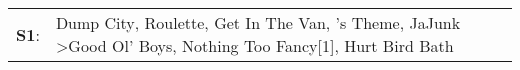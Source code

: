\begin{supertabular}{p{0.03\textwidth}p{0.92\textwidth}}
 \textbf{S1}:  &  Dump City\textsuperscript{}, \enspace Roulette\textsuperscript{}, \enspace Get In The Van\textsuperscript{}, 's Theme\textsuperscript{}, \enspace JaJunk\textsuperscript{} \textgreater \enspace Good Ol' Boys\textsuperscript{}, \enspace Nothing Too Fancy[1]\textsuperscript{}, \enspace Hurt Bird Bath\textsuperscript{}  \enspace  \\
\end{supertabular}
